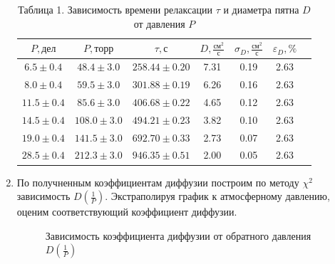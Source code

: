 \documentclass[a4paper]{article}
\begin{document}
\begin{enumerate}
\begin{table}[h!]
    \centering
    \begin{tabular}{|c|c|c|c|c|c|c|}
        \hline
        $P, \text{дел}$ & $P, \text{торр}$ & $\tau, \text{с}$ & $D, \frac{\text{см}^2}{\text{с}}$ & $\sigma_D, \frac{\text{см}^2}{\text{с}}$ & $\varepsilon_D, \%$ \\
        \hline
        $6.5 \pm 0.4$   & $48.4 \pm 3.0$  & $258.44 \pm 0.20$ & 7.31 & 0.19 & 2.63 \\ \hline
        $8.0 \pm 0.4$   & $59.5 \pm 3.0$  & $301.88 \pm 0.19$ & 6.26 & 0.16 & 2.63 \\ \hline
        $11.5 \pm 0.4$  & $85.6 \pm 3.0$  & $406.68 \pm 0.22$ & 4.65 & 0.12 & 2.63 \\ \hline
        $14.5 \pm 0.4$  & $108.0 \pm 3.0$ & $494.21 \pm 0.23$ & 3.82 & 0.10 & 2.63 \\ \hline
        $19.0 \pm 0.4$  & $141.5 \pm 3.0$ & $692.70 \pm 0.33$ & 2.73 & 0.07 & 2.63 \\ \hline
        $28.5 \pm 0.4$  & $212.3 \pm 3.0$ & $946.35 \pm 0.51$ & 2.00 & 0.05 & 2.63 \\
        \hline
    \end{tabular}
    \caption{Таблица 1. Зависимость времени релаксации $\tau$ и диаметра пятна $D$ от давления $P$}
\end{table}

\item По получненным коэффициентам диффузии построим по методу $\chi^2$ зависимость $D(\frac{1}{P})$. Экстраполируя график к атмосферному давлению, оценим соответствующий коэффициент диффузии.

\begin{figure}[h!]
\caption[]{\label{} Зависимость коэффициента диффузии от обратного давления $D(\frac{1}{P})$}
\end{figure}


\end{enumerate}
\end{document}
